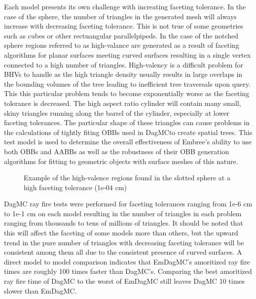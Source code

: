 \documentclass{anstrans}
\begin{document}
Each model presents its own challenge with increating faceting tolerance. In the case of the sphere, the number of triangles in the generated mesh will always increase with decreasing faceting tolerance. This is not true of some geometries such as cubes or other rectuangular parallelpipeds. In the case of the notched sphere regions referred to as high-valance are generated as a result of faceting algorithms for planar surfaces meeting curved surfaces resulting in a single vertex connected to a high number of triangles. High-valency is a difficult problem for BHVs to handle as the high triangle density usually results in large overlaps in the bounding volumes of the tree leading to inefficient tree traversals upon query. This this particular problem tends to become exponentially worse as the faceting tolerance is decreased. The high aspect ratio cylinder will contain many small, skiny triangles running along the barrel of the cylinder, especially at lower faceting tolerances. The particular shape of these triangles can cause problems in the calculations of tightly fiting OBBs used in DagMCto create spatial trees. This test model is used to determine the overall effectiveness of Embree's ability to use both OBBs and AABBs as well as the robustness of their OBB generation algorithms for fitting to geometric objects with surface meshes of this nature.

\begin{figure}

  \begin{center}

    \caption{Example of the high-valence regions found in the slotted sphere at a high faceting tolerance (1e-04 cm)}

  \end{center}

\end{figure}

DagMC ray fire tests were performed for faceting tolerances ranging from 1e-6 cm to 1e-1 cm on each model resulting in the number of triangles in each problem ranging from thousands to tens of millions of triangles. It should be noted that this will affect the faceting of some models more than others, but the upward trend in the pure number of triangles with decreasing faceting tolerance will be consistent among them all due to the consistent presence of curved surfaces. A direct model to model comparison indicates that EmDagMC's amoritized ray fire times are roughly 100 times faster than DagMC's. Comparing the best amoritized ray fire time of DagMC to the worst of EmDagMC  still leaves DagMC 10 times slower than EmDagMC.
\end{document}
